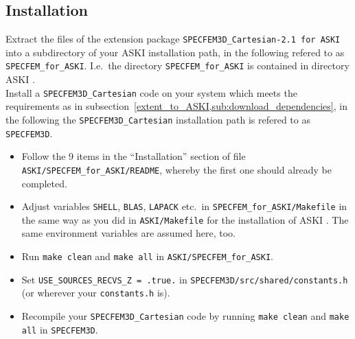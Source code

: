\documentclass[12pt,a4paper]{article}
\newcommand{\lcode}[1]{\nolinkurl{#1}}
\newcommand{\ASKI}{ {\ttfamily ASKI} }
\begin{document}
\subsection{Installation}
%
Extract the files of the extension package \lcode{SPECFEM3D_Cartesian-2.1 for ASKI} into a subdirectory
of your \ASKI installation path, in the following refered to as \lcode{SPECFEM_for_ASKI}. I.e.\ the directory 
\lcode{SPECFEM_for_ASKI} is contained in directory \ASKI.\\
Install a \lcode{SPECFEM3D_Cartesian} code on your system which meets the requirements as in 
subsection~\ref{extent_to_ASKI,sub:download_dependencies}, in the following the \lcode{SPECFEM3D_Cartesian} 
installation path is refered to as \lcode{SPECFEM3D}.
\begin{itemize}
\item Follow the 9 items in the ``Installation'' section of file \lcode{ASKI/SPECFEM_for_ASKI/README}, whereby the first one
  should already be completed.
\item Adjust variables \lcode{SHELL}, \lcode{BLAS}, \lcode{LAPACK} etc.\ in \lcode{SPECFEM_for_ASKI/Makefile} in the 
  same way as you did in \lcode{ASKI/Makefile} for the installation of \ASKI. The same environment variables are assumed 
  here, too.
\item Run \lcode{make clean} and \lcode{make all} in \lcode{ASKI/SPECFEM_for_ASKI}.
\item Set \lcode{USE_SOURCES_RECVS_Z = .true.} in \lcode{SPECFEM3D/src/shared/constants.h} (or wherever your \lcode{constants.h}
  is).
\item Recompile your \lcode{SPECFEM3D_Cartesian} code by running \lcode{make clean} and \lcode{make all} in \lcode{SPECFEM3D}.
\end{itemize}
%
\newpage

%
\end{document}
